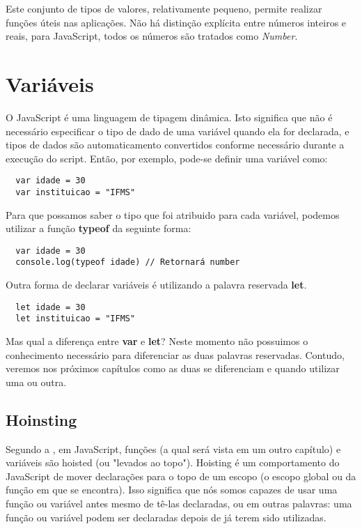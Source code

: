 Este conjunto de tipos de valores, relativamente pequeno, permite realizar 
funções úteis nas aplicações. Não há distinção explícita entre números inteiros 
e reais, para JavaScript, todos os números são tratados como \textit{Number}. 

\section{Variáveis}

O JavaScript é uma linguagem de tipagem dinâmica. Isto significa que não é 
necessário especificar o tipo de dado de uma variável quando ela for declarada, 
e tipos de dados são automaticamento convertidos conforme necessário durante a 
execução do script. Então, por exemplo, pode-se definir uma variável como:

\begin{lstlisting}
  var idade = 30
  var instituicao = "IFMS" 
\end{lstlisting}

Para que possamos saber o tipo que foi atribuido para cada variável, podemos 
utilizar a função \textbf{typeof} da seguinte forma: 

\begin{lstlisting}
  var idade = 30
  console.log(typeof idade) // Retornará number
\end{lstlisting}

Outra forma de declarar variáveis é utilizando a palavra reservada \textbf{let}.

\begin{lstlisting}
  let idade = 30
  let instituicao = "IFMS" 
\end{lstlisting} 

Mas qual a diferença entre \textbf{var} e \textbf{let}? Neste momento não 
possuimos o conhecimento necessário para diferenciar as duas palavras 
reservadas. Contudo, veremos nos próximos capítulos como as duas se diferenciam 
e quando utilizar uma ou outra.

\subsection{Hoinsting}

Segundo a , em JavaScript, funções (a qual será 
vista em um outro capítulo) e variáveis são hoisted (ou "levados ao topo"). 
Hoisting é um comportamento do JavaScript de mover declarações para o topo de 
um escopo (o escopo global ou da função em que se encontra). Isso significa que 
nós somos capazes de usar uma função ou variável antes mesmo de tê-las 
declaradas, ou em outras palavras: uma função ou variável podem ser declaradas 
depois de já terem sido utilizadas.

